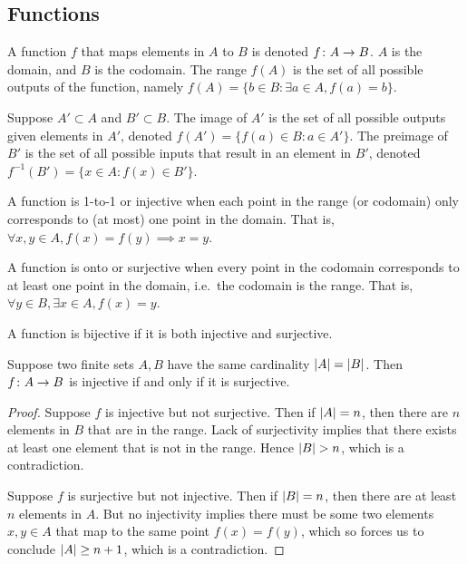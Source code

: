 \subsection{Functions}

\begin{definition}
    A function \(f\) that maps elements in \(A\) to \(B\)
    is denoted \(f\colon A\to B\).
    \(A\) is the domain, and \(B\) is the codomain.
    The range \(f(A)\) is the set of all possible outputs of the function,
    namely \(f(A) = \{b \in B : \exists a \in A, f(a) = b\}\).
\end{definition}

\begin{definition}
    Suppose \(A' \subset A\) and \(B' \subset B\).
    The image of \(A'\) is the set of all possible outputs
    given elements in \(A'\),
    denoted \(f(A') = \{f(a) \in B : a \in A'\}\).
    The preimage of \(B'\) is the set of all possible inputs
    that result in an element in \(B'\),
    denoted \(f^{-1}(B') = \{x \in A : f(x) \in B'\}\).
\end{definition}

\begin{definition}
    A function is 1-to-1 or injective
    when each point in the range (or codomain)
    only corresponds to (at most) one point in the domain.
    That is, \(\forall x,y \in A, f(x) = f(y) \implies x = y\).
\end{definition}
\begin{definition}
    A function is onto or surjective
    when every point in the codomain
    corresponds to at least one point in the domain,
    i.e.\ the codomain is the range.
    That is, \(\forall y \in B, \exists x \in A, f(x) = y\).
\end{definition}
\begin{definition}
    A function is bijective if it is both injective and surjective.
\end{definition}


\begin{theorem}\label{thm:pigeonhole}
    Suppose two finite sets \(A,B\) have the same cardinality
    \(\abs{A} = \abs{B}\).
    Then \(f\colon A\to B\) is injective
    if and only if it is surjective.
\end{theorem}
\begin{proof}
    Suppose \(f\) is injective but not surjective.
    Then if \(\abs{A} = n\),
    then there are \(n\) elements in \(B\) that are in the range.
    Lack of surjectivity implies that
    there exists at least one element that is not in the range.
    Hence \(\abs{B} > n\), which is a contradiction.

    Suppose \(f\) is surjective but not injective.
    Then if \(\abs{B} = n\),
    then there are at least \(n\) elements in \(A\).
    But no injectivity implies there must be some two elements
    \(x,y \in A\) that map to the same point \(f(x) = f(y)\),
    which so forces us to conclude \(\abs{A} \geq n+1\),
    which is a contradiction.
\end{proof}


